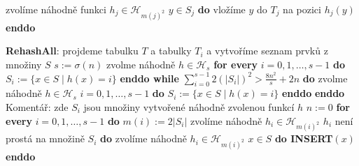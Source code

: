 \documentclass[a4paper,12pt]{article}
\begin{document}
\phantom{---------------}zvolíme náhodně funkci $
h_j\in \mathcal H_{m(j)^2}$\newline 
\phantom{------------}{\bf enddo}\newline 
{} $y\in S_j$ {\bf do} vložíme $
y$ do $T_j$ na pozici $h_j(y)$ {\bf enddo}\newline 
\phantom{---------}{\bf endif}\newline 
\phantom{------}{\bf endif}\newline 
\phantom{---}{\bf else}\newline 
\phantom{------}{\bf RehashAll}\newline 
\phantom{---}{\bf endif\newline 
endif}


{\bf RehashAll}:\newline 
projdeme tabulku $T$ a tabulky $T_i$ a vytvoříme seznam 
prvků z množiny $S$\newline 
$s:=\sigma(n)$\newline 
zvolme náhodně $h\in \mathcal H_s$ \newline 
{\bf \textsf{for every}} $i=0,1,\dots,s-1$ {\bf do} $S_i:=\{x\in 
S\mid h(x)=i\}$ {\bf enddo\newline 
while} $\sum_{i=0}^{s-1}2(|S_i|)^2>\frac {8n^2}s+2n$ {\bf do}\newline 
\phantom{---}zvolme náhodně $h\in \mathcal H_s$ \newline 
{} $i=0,1,\dots,s-1$ {\bf do} $
S_i:=\{x\in S\mid h(x)=i\}$ {\bf enddo}\newline 
{\bf enddo}\newline
Komentář: zde $S_i$ jsou množiny vytvořené náhodně zvolenou 
funkcí $h$ \newline 
$n:=0$ \newline 
{\bf \textsf{for every}} $i=0,1,\dots,s-1$ {\bf do}\newline 
\phantom{---}$m(i):=2|S_i|$\newline 
\phantom{---}zvolíme náhodně $h_i\in \mathcal H_{m(i
)^2}$\newline 
\phantom{---}{\bf while} $h_i$ není prostá na množině $
S_i$ {\bf do}\newline 
\phantom{------}zvolíme náhodně $h_i\in \mathcal H_{m(i)^2}$\newline 
{} $x\in S$ {\bf do INSERT$(x)$ enddo}
\end{document}
